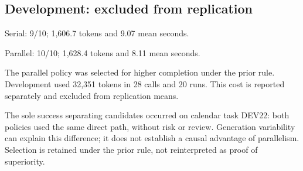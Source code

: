 \subsection{Development: excluded from replication}

Serial: 9/10; 1,606.7 tokens and 9.07 mean seconds.

Parallel: 10/10; 1,628.4 tokens and 8.11 mean seconds.

The parallel policy was selected for higher completion under the prior rule. Development used 32,351 tokens in 28 calls and 20 runs. This cost is reported separately and excluded from replication means.

The sole success separating candidates occurred on calendar task DEV22: both policies used the same direct path, without risk or review. Generation variability can explain this difference; it does not establish a causal advantage of parallelism. Selection is retained under the prior rule, not reinterpreted as proof of superiority.
